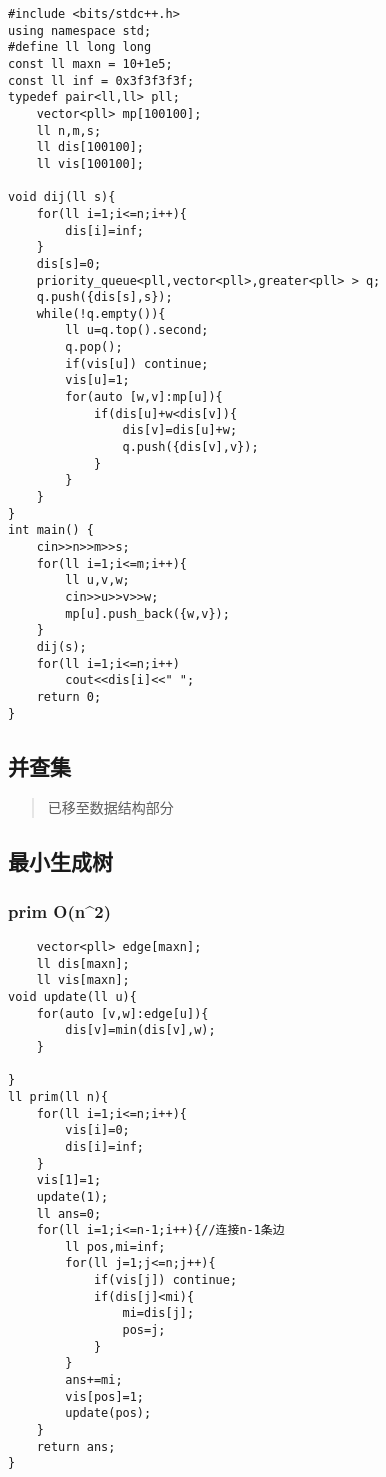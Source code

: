\documentclass[]{article}
\begin{document}
\begin{verbatim}
#include <bits/stdc++.h>
using namespace std;
#define ll long long
const ll maxn = 10+1e5;
const ll inf = 0x3f3f3f3f;
typedef pair<ll,ll> pll;
    vector<pll> mp[100100];
    ll n,m,s;
    ll dis[100100];
    ll vis[100100];

void dij(ll s){
    for(ll i=1;i<=n;i++){
        dis[i]=inf;
    }
    dis[s]=0;
    priority_queue<pll,vector<pll>,greater<pll> > q;
    q.push({dis[s],s});
    while(!q.empty()){
        ll u=q.top().second;
        q.pop();
        if(vis[u]) continue;
        vis[u]=1;
        for(auto [w,v]:mp[u]){
            if(dis[u]+w<dis[v]){
                dis[v]=dis[u]+w;
                q.push({dis[v],v});
            }
        }
    }
}
int main() {
    cin>>n>>m>>s;
    for(ll i=1;i<=m;i++){
        ll u,v,w;
        cin>>u>>v>>w;
        mp[u].push_back({w,v});
    }
    dij(s);
    for(ll i=1;i<=n;i++)
        cout<<dis[i]<<" ";
    return 0;
}
\end{verbatim}

\hypertarget{ux5e76ux67e5ux96c6-1}{%
\subsection{并查集}\label{ux5e76ux67e5ux96c6-1}}

\begin{quote}
已移至数据结构部分
\end{quote}

\hypertarget{ux6700ux5c0fux751fux6210ux6811}{%
\subsection{最小生成树}\label{ux6700ux5c0fux751fux6210ux6811}}

\hypertarget{prim-on2}{%
\subsubsection{prim O(n\^{}2)}\label{prim-on2}}

\begin{verbatim}
    vector<pll> edge[maxn];
    ll dis[maxn];
    ll vis[maxn];
void update(ll u){
    for(auto [v,w]:edge[u]){
        dis[v]=min(dis[v],w);
    }

}
ll prim(ll n){
    for(ll i=1;i<=n;i++){
        vis[i]=0;
        dis[i]=inf;
    }
    vis[1]=1;
    update(1);
    ll ans=0;
    for(ll i=1;i<=n-1;i++){//连接n-1条边
        ll pos,mi=inf;
        for(ll j=1;j<=n;j++){
            if(vis[j]) continue;
            if(dis[j]<mi){
                mi=dis[j];
                pos=j;
            }
        }
        ans+=mi;
        vis[pos]=1;
        update(pos);    
    }
    return ans;
}
\end{verbatim}
\end{document}
